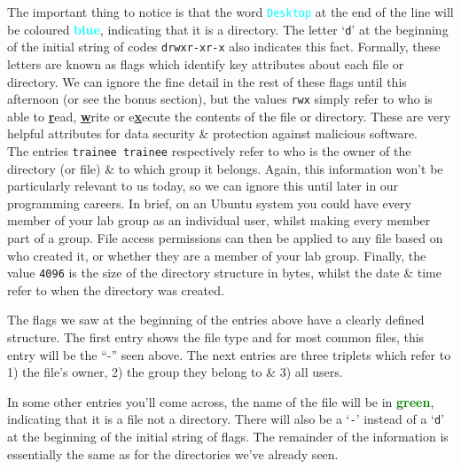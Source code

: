 \documentclass[a4paper,12pt,twoside]{memoir}
\begin{document}
\begin{information}
The important thing to notice is that the word \textcolor{cyan}{\texttt{Desktop}} at the end of the line will be coloured \textcolor{cyan}{\textbf{blue}}, indicating that it is a directory.
The letter `\texttt{d}' at the beginning of the initial string of codes \texttt{drwxr-xr-x} also indicates this fact.
Formally, these letters are known as flags which identify key attributes about each file or directory.
We can ignore the fine detail in the rest of these flags until this afternoon (or see the bonus section), but the values \texttt{rwx} simply refer to who is able to \textbf{\underline{r}}ead, \textbf{\underline{w}}rite or e\textbf{\underline{x}}ecute the contents of the file or directory. 
These are very helpful attributes for data security \& protection against malicious software.\\

The entries \texttt{trainee trainee} respectively refer to who is the owner of the directory (or file) \& to which group it belongs.
Again, this information won't be particularly relevant to us today, so we can ignore this until later in our programming careers.
In brief, on an Ubuntu system you could have every member of your lab group as an individual user, whilst making every member part of a group.
File access permissions can then be applied to any file based on who created it, or whether they are a member of your lab group.
Finally, the value \texttt{4096} is the size of the directory structure in bytes, whilst the date \& time refer to when the directory was created.\\

\begin{bonus}
The flags we saw at the beginning of the entries above have a clearly defined structure. 
The first entry shows the file type and for most common files, this entry will be the ``-'' seen above.
The next entries are three triplets which refer to 1) the file's owner, 2) the group they belong to \& 3) all users.
\end{bonus}

In some other entries you'll come across, the name of the file will be in \textcolor{green}{\textbf{green}}, indicating that it is a file not a directory.
There will also be a `\texttt{-}' instead of a `\texttt{d}' at the beginning of the initial string of flags. 
The remainder of the information is essentially the same as for the directories we've already seen.\\
\end{information}
\end{document}

